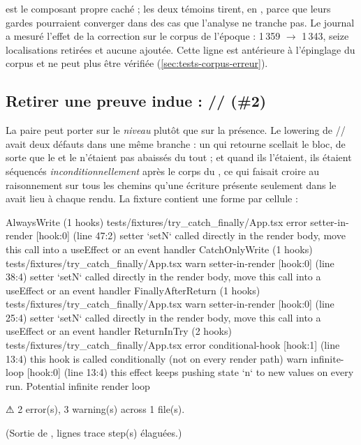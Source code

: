  est le composant propre caché ; les deux témoins tirent, en \Warning{}, parce que leurs gardes pourraient converger dans des cas que l'analyse ne tranche pas. Le journal a mesuré l'effet de la correction sur le corpus de l'époque : 1\,359 $\to$ 1\,343, seize localisations retirées et aucune ajoutée. Cette ligne est antérieure à l'épinglage du corpus et ne peut plus être vérifiée (\cref{sec:tests-corpus-erreur}).

\subsection{Retirer une preuve indue : // (\#2)}

La paire peut porter sur le \emph{niveau} plutôt que sur la présence. Le lowering de // avait deux défauts dans une même branche : un  qui retourne scellait le bloc, de sorte que le  et le  n'étaient pas abaissés du tout ; et quand ils l'étaient, ils étaient séquencés \emph{inconditionnellement} après le corps du , ce qui faisait croire au raisonnement \og sur tous les chemins\fg{} qu'une écriture présente seulement dans le  avait lieu à chaque rendu. La fixture  contient une forme par cellule :


\begin{sortie}
  AlwaysWrite  (1 hooks)  tests/fixtures/try_catch_finally/App.tsx
    error  setter-in-render  [hook:0]  (line 47:2)  setter `setN` called directly in the render body, move this call into a useEffect or an event handler
  CatchOnlyWrite  (1 hooks)  tests/fixtures/try_catch_finally/App.tsx
    warn   setter-in-render  [hook:0]  (line 38:4)  setter `setN` called directly in the render body, move this call into a useEffect or an event handler
  FinallyAfterReturn  (1 hooks)  tests/fixtures/try_catch_finally/App.tsx
    warn   setter-in-render  [hook:0]  (line 25:4)  setter `setN` called directly in the render body, move this call into a useEffect or an event handler
  ReturnInTry  (2 hooks)  tests/fixtures/try_catch_finally/App.tsx
    error  conditional-hook  [hook:1]  (line 13:4)  this hook is called conditionally (not on every render path)
    warn   infinite-loop  [hook:0]  (line 13:4)  this effect keeps pushing state `n` to new values on every run. Potential infinite render loop

⚠  2 error(s), 3 warning(s) across 1 file(s).
\end{sortie}
\noindent(Sortie de , lignes \og trace step(s)\fg{} élaguées.)

